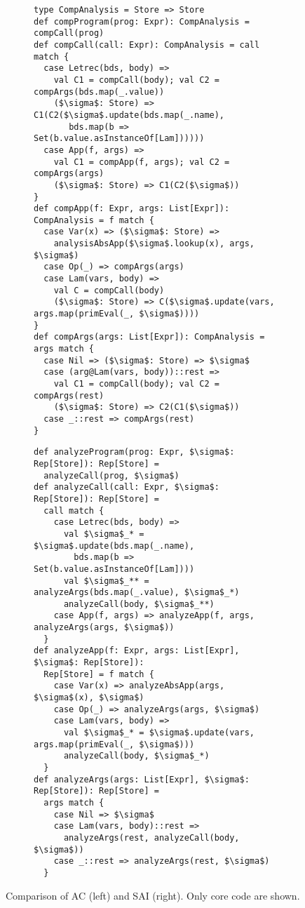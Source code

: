 \begin{figure*}
  \centering
  \begin{subfigure}[h]{0.49\textwidth}
    \centering
    \begin{lstlisting}[style=extrasmall]
type CompAnalysis = Store => Store
def compProgram(prog: Expr): CompAnalysis = compCall(prog)
def compCall(call: Expr): CompAnalysis = call match {
  case Letrec(bds, body) =>
    val C1 = compCall(body); val C2 = compArgs(bds.map(_.value))
    ($\sigma$: Store) => C1(C2($\sigma$.update(bds.map(_.name), 
       bds.map(b => Set(b.value.asInstanceOf[Lam])))))
  case App(f, args) =>
    val C1 = compApp(f, args); val C2 = compArgs(args)
    ($\sigma$: Store) => C1(C2($\sigma$))
}
def compApp(f: Expr, args: List[Expr]): CompAnalysis = f match {
  case Var(x) => ($\sigma$: Store) => 
    analysisAbsApp($\sigma$.lookup(x), args, $\sigma$)
  case Op(_) => compArgs(args)
  case Lam(vars, body) =>
    val C = compCall(body)
    ($\sigma$: Store) => C($\sigma$.update(vars, args.map(primEval(_, $\sigma$))))
}
def compArgs(args: List[Expr]): CompAnalysis = args match {
  case Nil => ($\sigma$: Store) => $\sigma$
  case (arg@Lam(vars, body))::rest =>
    val C1 = compCall(body); val C2 = compArgs(rest)
    ($\sigma$: Store) => C2(C1($\sigma$))
  case _::rest => compArgs(rest)
}
  \end{lstlisting}
  \end{subfigure}
\hfill
  \begin{subfigure}[h]{0.49\textwidth}
    \centering
    \begin{lstlisting}[style=extrasmall]
def analyzeProgram(prog: Expr, $\sigma$: Rep[Store]): Rep[Store] = 
  analyzeCall(prog, $\sigma$)
def analyzeCall(call: Expr, $\sigma$: Rep[Store]): Rep[Store] = 
  call match {
    case Letrec(bds, body) =>
      val $\sigma$_* = $\sigma$.update(bds.map(_.name), 
        bds.map(b => Set(b.value.asInstanceOf[Lam])))
      val $\sigma$_** = analyzeArgs(bds.map(_.value), $\sigma$_*)
      analyzeCall(body, $\sigma$_**)
    case App(f, args) => analyzeApp(f, args, analyzeArgs(args, $\sigma$))
  }
def analyzeApp(f: Expr, args: List[Expr], $\sigma$: Rep[Store]): 
  Rep[Store] = f match {
    case Var(x) => analyzeAbsApp(args, $\sigma$(x), $\sigma$)
    case Op(_) => analyzeArgs(args, $\sigma$)
    case Lam(vars, body) =>
      val $\sigma$_* = $\sigma$.update(vars, args.map(primEval(_, $\sigma$)))
      analyzeCall(body, $\sigma$_*)
  }
def analyzeArgs(args: List[Expr], $\sigma$: Rep[Store]): Rep[Store] = 
  args match {
    case Nil => $\sigma$
    case Lam(vars, body)::rest => 
      analyzeArgs(rest, analyzeCall(body, $\sigma$))
    case _::rest => analyzeArgs(rest, $\sigma$)
  }
  \end{lstlisting}

  \end{subfigure}
  \caption{Comparison of AC (left) and SAI (right). Only core code are shown.}
  \label{compare_ac_sai}
\end{figure*}


